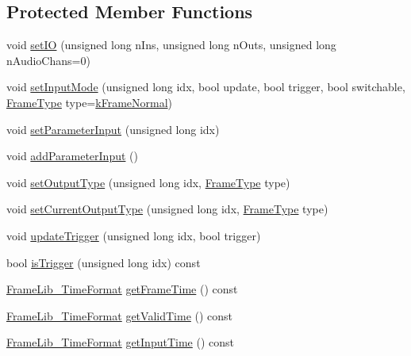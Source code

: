 \subsection*{Protected Member Functions}
\begin{DoxyCompactItemize}
\item 
void \hyperlink{class_frame_lib___d_s_p_a3d184baeb7b55fa099cb9c4a7393c70c}{set\+IO} (unsigned long n\+Ins, unsigned long n\+Outs, unsigned long n\+Audio\+Chans=0)
\item 
void \hyperlink{class_frame_lib___d_s_p_ae88480e015d70507fd1f7853fc17ffa2}{set\+Input\+Mode} (unsigned long idx, bool update, bool trigger, bool switchable, \hyperlink{_frame_lib___types_8h_ad495a9f61af7fff07d7e97979d1ab854}{Frame\+Type} type=\hyperlink{_frame_lib___types_8h_ad495a9f61af7fff07d7e97979d1ab854a4bc2388cbdd721f5039a32f95cd92b03}{k\+Frame\+Normal})
\item 
void \hyperlink{class_frame_lib___d_s_p_abcbe8babb74a7b85faf8846b4a0ff95f}{set\+Parameter\+Input} (unsigned long idx)
\item 
void \hyperlink{class_frame_lib___d_s_p_aa000b56c19ad1fbdc4f3fe56b0ca762d}{add\+Parameter\+Input} ()
\item 
void \hyperlink{class_frame_lib___d_s_p_a43da3ff5b57b3c1da655b0e6c7c0b37f}{set\+Output\+Type} (unsigned long idx, \hyperlink{_frame_lib___types_8h_ad495a9f61af7fff07d7e97979d1ab854}{Frame\+Type} type)
\item 
void \hyperlink{class_frame_lib___d_s_p_aa2854abee0acbd4e3192a38cb5dc4155}{set\+Current\+Output\+Type} (unsigned long idx, \hyperlink{_frame_lib___types_8h_ad495a9f61af7fff07d7e97979d1ab854}{Frame\+Type} type)
\item 
void \hyperlink{class_frame_lib___d_s_p_a2e3084ad267a330ec021bd558edd3f57}{update\+Trigger} (unsigned long idx, bool trigger)
\item 
bool \hyperlink{class_frame_lib___d_s_p_a13e269a66e0b9fb40ead089530e49eaa}{is\+Trigger} (unsigned long idx) const
\item 
\hyperlink{struct_frame_lib___time_format}{Frame\+Lib\+\_\+\+Time\+Format} \hyperlink{class_frame_lib___d_s_p_a2eedff2474f665b5bf7d2f2fa7a1cdc4}{get\+Frame\+Time} () const
\item 
\hyperlink{struct_frame_lib___time_format}{Frame\+Lib\+\_\+\+Time\+Format} \hyperlink{class_frame_lib___d_s_p_afa420e10b7ea7a300bf106631167cac0}{get\+Valid\+Time} () const
\item 
\hyperlink{struct_frame_lib___time_format}{Frame\+Lib\+\_\+\+Time\+Format} \hyperlink{class_frame_lib___d_s_p_afd7cae225f75c8cd4bd773bf188961b2}{get\+Input\+Time} () const

\end{DoxyCompactItemize}
